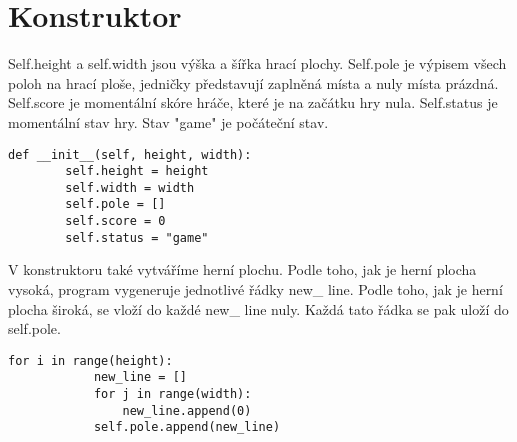 \documentclass[12pt]{report}			%
\begin{document}
    			\section{Konstruktor}
Self.height a self.width jsou výška a šířka hrací plochy. Self.pole je výpisem všech poloh na hrací ploše, jedničky představují zaplněná místa a nuly místa prázdná. Self.score je momentální skóre hráče, které je na začátku hry nula. Self.status je momentální stav hry. Stav "game" je počáteční stav.
\begin{lstlisting}[title={Program tetris.py}, caption={Konstruktor třídy Tetris}, 							label={lst:tetris.py}]		
    def __init__(self, height, width):
        self.height = height
        self.width = width
        self.pole = []
        self.score = 0
        self.status = "game"
\end{lstlisting}
V konstruktoru také vytváříme herní plochu. Podle toho, jak je herní plocha vysoká, program vygeneruje jednotlivé řádky new\_ line. Podle toho, jak je herní plocha široká, se vloží do každé new\_ line nuly. Každá tato řádka se pak uloží do self.pole.\\
\begin{lstlisting}[title={Program tetris.py}, caption={Tvorba herní plochy}, 							label={lst:tetris.py}]
        for i in range(height):
            new_line = []
            for j in range(width):
                new_line.append(0)
            self.pole.append(new_line)
\end{lstlisting}
\end{document}
